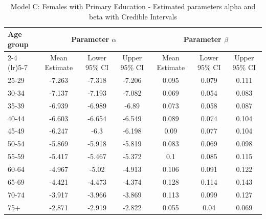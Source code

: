 \begin{landscape}
\begin{table}[htbp]
\centering
\caption{Model C: Females with Primary Education - Estimated parameters alpha and beta  with Credible Intervals}
\label{tab:parameters_ab18}
\begin{tabular}{@{}lcccccc@{}}
\toprule
Age group & \multicolumn{3}{c}{Parameter \(\alpha\)} & \multicolumn{3}{c}{Parameter \(\beta\)} \\ 
\cmidrule(lr){2-4} \cmidrule(lr){5-7}
          & Mean Estimate & Lower 95\% CI & Upper 95\% CI & Mean Estimate & Lower 95\% CI & Upper 95\% CI \\ 
\midrule
25-29 & -7.263 & -7.318 & -7.206 & 0.095 & 0.079 & 0.111 \\
30-34 & -7.137 & -7.193 & -7.082 & 0.069 & 0.054 & 0.083 \\
35-39 & -6.939 & -6.989 & -6.89 & 0.073 & 0.058 & 0.087 \\
40-44 & -6.603 & -6.654 & -6.549 & 0.089 & 0.074 & 0.104 \\
45-49 & -6.247 & -6.3 & -6.198 & 0.09 & 0.077 & 0.104 \\
50-54 & -5.869 & -5.918 & -5.819 & 0.083 & 0.069 & 0.098 \\
55-59 & -5.417 & -5.467 & -5.372 & 0.1 & 0.085 & 0.115 \\
60-64 & -4.967 & -5.02 & -4.913 & 0.106 & 0.091 & 0.122 \\
65-69 & -4.421 & -4.473 & -4.374 & 0.128 & 0.114 & 0.143 \\
70-74 & -3.917 & -3.966 & -3.869 & 0.113 & 0.099 & 0.127 \\
75+ & -2.871 & -2.919 & -2.822 & 0.055 & 0.04 & 0.069 \\
\bottomrule
\end{tabular}
\end{table}
\end{landscape}
